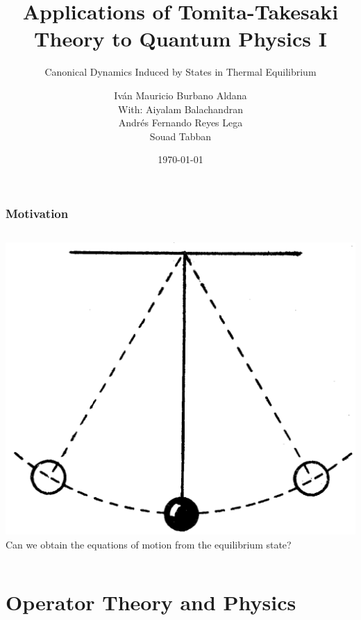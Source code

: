 \documentclass{beamer}
\title[Tomita-Takesaki and Quantum]{Applications of Tomita-Takesaki Theory to Quantum Physics I\nocite{Burbano2017}}
\subtitle{Canonical Dynamics Induced by States in Thermal Equilibrium}
\author[Iván Burbano]{Iván Mauricio Burbano Aldana \\ {\tiny With: Aiyalam Balachandran} \\ {\tiny Andrés Fernando Reyes Lega} \\ {\tiny Souad Tabban}}
\institute{Universidad de los Andes}
\date{\today}
\begin{document}
\begin{frame}
	\titlepage
\end{frame}

\begin{frame}
	\frametitle{Motivation}
	\begin{columns}
		\includegraphics[width=\textwidth]{images/pendulum.png}
		Can we obtain the equations of motion from the equilibrium state?
		\vspace{1cm}
		
	\end{columns}
\end{frame}

\begin{frame}
	\tableofcontents
\end{frame}

\section{Operator Theory and Physics}
\end{document}
